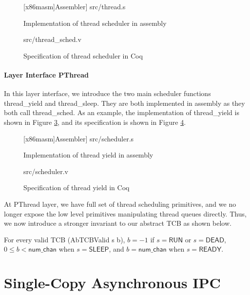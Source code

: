 \begin{figure}
	{[x86masm]Assembler}] {src/thread.s}
	\caption{Implementation of thread scheduler in assembly}
	\label{fig:thread_s}
\end{figure}

\begin{figure}
	 {src/thread_sched.v}
	\caption{Specification of thread scheduler in Coq}
	\label{fig:thread_sched_v}
\end{figure}

\paragraph{Layer Interface PThread}

In this layer interface, we introduce the two main scheduler functions \textsf{thread\_yield} and
\textsf{thread\_sleep}. They are both implemented in assembly as they both call \textsf{thread\_sched}.
As an example, the implementation of \textsf{thread\_yield} is shown in Figure \ref{fig:scheduler_s}, and
its specification is shown in Figure \ref{fig:scheduler_v}.

\begin{figure}
	{[x86masm]Assembler}] {src/scheduler.s}
	\caption{Implementation of thread yield in assembly}
	\label{fig:scheduler_s}
\end{figure}

\begin{figure}
	 {src/scheduler.v}
	\caption{Specification of thread yield in Coq}
	\label{fig:scheduler_v}
\end{figure}

At PThread layer, we have full set of thread scheduling primitives, and we no longer expose the low
level primitives manipulating thread queues directly. Thus, we now introduce a stronger invariant
to our abstract TCB as shown below.

\begin{invariant}
For every valid TCB (\textsf{AbTCBValid s b}), $b=-1$ if $s=\textsf{RUN}$ or $s=\textsf{DEAD}$,
$0\le b < \textsf{num\_chan}$ when $s=\textsf{SLEEP}$, and $b=\textsf{num\_chan}$ when $s=\textsf{READY}$.
\end{invariant}


\section{Single-Copy Asynchronous IPC}

